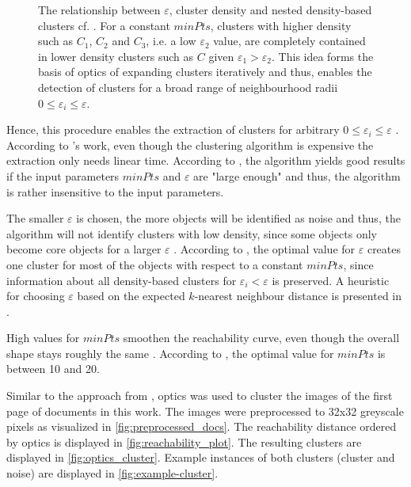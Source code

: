 \begin{figure}[htp] %
    \centering
    
    \caption{The relationship between $\varepsilon$, cluster density and nested density-based clusters cf. \cite{OPTICS1999}.
    For a constant $minPts$, clusters with higher density such as $C_1$, $C_2$ and $C_3$, i.e. a low $\varepsilon_2$ value, 
    are completely contained in lower density clusters such as $C$ given $\varepsilon_1 > \varepsilon_2$.
    This idea forms the basis of \ac{optics} of expanding clusters iteratively and thus, 
    enables the detection of clusters for a broad range of neighbourhood radii $0 \le \varepsilon_i \le \varepsilon$.
    }
    \label{fig:nested_density_cluster}
\end{figure}

Hence, this procedure enables the extraction of clusters for arbitrary $0 \le \varepsilon_i \le \varepsilon$ \cite{OPTICS_kMeans_2016, OPTICS1999}.
According to \citeauthor{OPTICS2013}'s work, even though the clustering algorithm is expensive the extraction only needs linear time.
According to \cite{OPTICS1999}, the algorithm yields good results if the input parameters $minPts$ and $\varepsilon$ are "large enough" and thus, the algorithm is rather insensitive to the input parameters.

The smaller $\varepsilon$ is chosen, the more objects will be identified as noise and thus, the algorithm will not identify clusters with low density, 
since some objects only become core objects for a larger $\varepsilon$ \cite{OPTICS1999}.
According to \citeauthor{OPTICS1999}, the optimal value for $\varepsilon$ creates one cluster for most of the objects with respect to a constant $minPts$,
since information about all density-based clusters for $\varepsilon_i < \varepsilon$ is preserved.
A heuristic for choosing $\varepsilon$ based on the expected $k$-nearest neighbour distance is presented in \cite{OPTICS1999}.

High values for $minPts$ smoothen the reachability curve, even though the overall shape stays roughly the same \cite{OPTICS1999}.
According to \citeauthor{OPTICS1999}, the optimal value for $minPts$ is between 10 and 20.

Similar to the approach from \cite{OPTICS1999}, \ac{optics} was used to cluster the images of the first page of documents in this work.
The images were preprocessed to 32x32 greyscale pixels as visualized in \autoref{fig:preprocessed_docs}.
The reachability distance ordered by \ac{optics} is displayed in \autoref{fig:reachability_plot}.
The resulting clusters are displayed in \autoref{fig:optics_cluster}.
Example instances of both clusters (cluster and noise) are displayed in \autoref{fig:example-cluster}.


